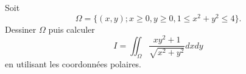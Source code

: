 
\begin{exercice}\label{exoOutilsMath-0120}

    Soit
    \begin{equation}
        \Omega=\{ (x,y);x\geq 0,y\geq 0,1\leq x^2+y^2\leq 4 \}.
    \end{equation}
    Dessiner \( \Omega\) puis calculer
    \begin{equation}
        I=\iint_{\Omega}\frac{ xy^2+1 }{ \sqrt{x^2+y^2} }dxdy
    \end{equation}
    en utilisant les coordonnées polaires.

\end{exercice}
